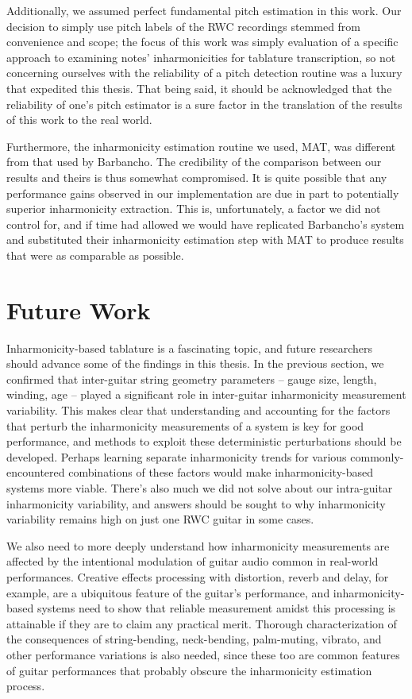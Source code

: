 \documentclass[12pt]{cmuthesis}
\begin{document}
Additionally, we assumed perfect fundamental pitch estimation in this work. Our decision to simply use pitch labels of the RWC recordings stemmed from convenience and scope; the focus of this work was simply evaluation of a specific approach to examining notes' inharmonicities for tablature transcription, so not concerning ourselves with the reliability of a pitch detection routine was a luxury that expedited this thesis. That being said, it should be acknowledged that the reliability of one's pitch estimator is a sure factor in the translation of the results of this work to the real world.

Furthermore, the inharmonicity estimation routine we used, MAT, was different from that used by Barbancho. The credibility of the comparison between our results and theirs is thus somewhat compromised. It is quite possible that any performance gains observed in our implementation are due in part to potentially superior inharmonicity extraction. This is, unfortunately, a factor we did not control for, and if time had allowed we would have replicated Barbancho's system and substituted their inharmonicity estimation step with MAT to produce results that were as comparable as possible.

\section{Future Work}
Inharmonicity-based tablature is a fascinating topic, and future researchers should advance some of the findings in this thesis. In the previous section, we confirmed that inter-guitar string geometry parameters -- gauge size, length, winding, age -- played a significant role in inter-guitar inharmonicity measurement variability. This makes clear that understanding and accounting for the factors that perturb the inharmonicity measurements of a system is key for good performance, and methods to exploit these deterministic perturbations should be developed. Perhaps learning separate inharmonicity trends for various commonly-encountered combinations of these factors would make inharmonicity-based systems more viable. There's also much we did not solve about our intra-guitar inharmonicity variability, and answers should be sought to why inharmonicity variability remains high on just one RWC guitar in some cases.

We also need to more deeply understand how inharmonicity measurements are affected by the intentional modulation of guitar audio common in real-world performances. Creative effects processing with distortion, reverb and delay, for example, are a ubiquitous feature of the guitar's performance, and inharmonicity-based systems need to show that reliable measurement amidst this processing is attainable if they are to claim any practical merit. Thorough characterization of the consequences of string-bending, neck-bending, palm-muting, vibrato, and other performance variations is also needed, since these too are common features of guitar performances that probably obscure the inharmonicity estimation process.
\end{document}
